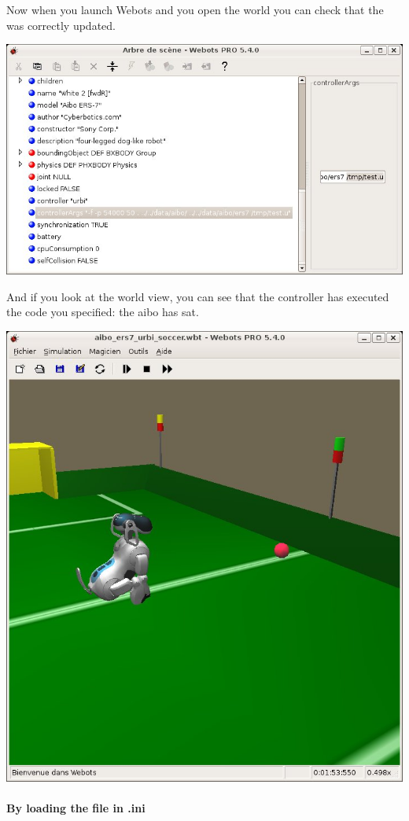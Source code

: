Now when you launch Webots and you open the world
 you can check that the
 was correctly updated.

\begin{center}
  \includegraphics[width=.8\linewidth]{img/webots/scene-tree-add-loaded-file}
\end{center}

And if you look at the world view, you can see that the controller has
executed the \urbi code you specified: the aibo has sat.

\begin{center}
  \includegraphics[width=.8\linewidth]{img/webots/aibo-sat}
\end{center}



\paragraph{By loading the file in \urbi.ini}

